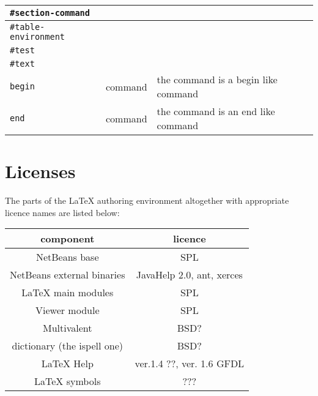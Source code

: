 \documentclass{report}
\newcommand{\lenv}{\LaTeX{} authoring environment\xspace}
\begin{document}
\begin{tabular}{| l | c | p{5cm} |}
\verb+#section-command+ & & \\\hline
\verb+#table-environment+ & & \\\hline
\verb+#test+ & & \\\hline
\verb+#text+ & & \\\hline
\verb+begin+ & command & the command is a begin like command\\\hline
\verb+end+ & command & the command is an end like command\\\hline
\end{tabular}

\chapter{Licenses}

The parts of the \lenv altogether with appropriate licence names are listed below:

\begin{table}
\begin{tabular}{| c | c |}
\hline
component & licence \\
\hline
NetBeans base & SPL \\
\hline
NetBeans external binaries & JavaHelp 2.0, ant, xerces \\
\hline
\LaTeX{} main modules & SPL \\
\hline
Viewer module & SPL\\
\hline
Multivalent & BSD? \\
\hline
dictionary (the ispell one) & BSD? \\
\hline
\LaTeX{} Help & ver.1.4 ??, ver. 1.6 GFDL \\
\hline
\LaTeX{} symbols & ???\\
\hline
\end{tabular}
\end{table}
\end{document}
